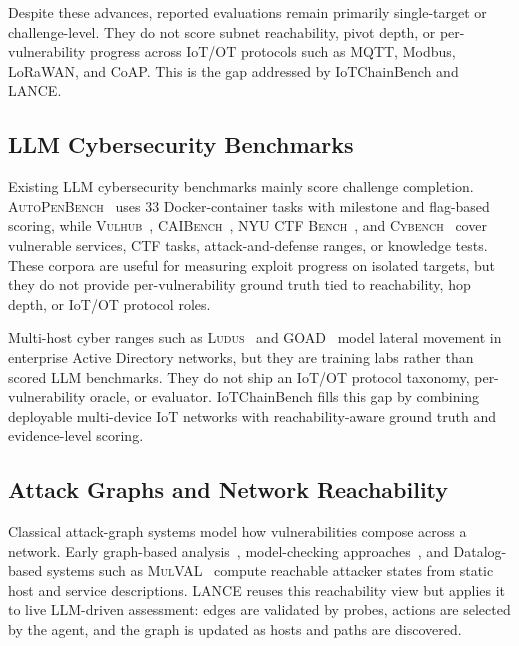 \documentclass[conference,compsoc]{IEEEtran}
\newcommand{\systemname}{IoTChainBench\xspace}
\newcommand{\harnessname}{\textsc{LANCE}\xspace}
\begin{document}
Despite these advances, reported evaluations remain primarily single-target or challenge-level. They do not score subnet reachability, pivot depth, or per-vulnerability progress across IoT/OT protocols such as MQTT, Modbus, LoRaWAN, and CoAP. This is the gap addressed by \systemname{} and \harnessname{}.

\subsection{LLM Cybersecurity Benchmarks}
\label{sec:related:bench}

Existing LLM cybersecurity benchmarks mainly score challenge completion. \textsc{AutoPenBench}~\cite{autopenbench24} uses 33 Docker-container tasks with milestone and flag-based scoring, while \textsc{Vulhub}~\cite{vulhub}, \textsc{CAIBench}~\cite{caibench25}, \textsc{NYU CTF Bench}~\cite{nyuctfbench24}, and \textsc{Cybench}~\cite{cybench24} cover vulnerable services, CTF tasks, attack-and-defense ranges, or knowledge tests. These corpora are useful for measuring exploit progress on isolated targets, but they do not provide per-vulnerability ground truth tied to reachability, hop depth, or IoT/OT protocol roles.

Multi-host cyber ranges such as \textsc{Ludus}~\cite{ludus} and \textsc{GOAD}~\cite{goad} model lateral movement in enterprise Active Directory networks, but they are training labs rather than scored LLM benchmarks. They do not ship an IoT/OT protocol taxonomy, per-vulnerability oracle, or evaluator. \systemname{} fills this gap by combining deployable multi-device IoT networks with reachability-aware ground truth and evidence-level scoring.

\subsection{Attack Graphs and Network Reachability}
\label{sec:related:graph}

Classical attack-graph systems model how vulnerabilities compose across a network. Early graph-based analysis~\cite{phillips98}, model-checking approaches~\cite{sheyner02}, and Datalog-based systems such as \textsc{MulVAL}~\cite{mulval05} compute reachable attacker states from static host and service descriptions. \harnessname{} reuses this reachability view but applies it to live LLM-driven assessment: edges are validated by probes, actions are selected by the agent, and the graph is updated as hosts and paths are discovered.
\end{document}
